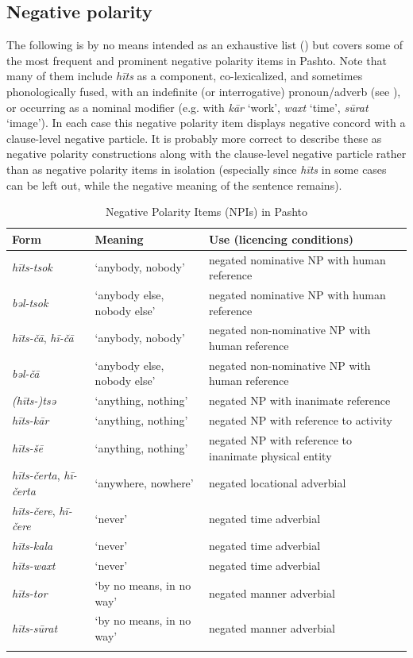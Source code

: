 \documentclass[output=paper,colorlinks,citecolor=brown]{langscibook}
\begin{document}
\subsection{Negative polarity}\label{sec:pas:4.2}

The following is by no means intended as an exhaustive list () but covers some of the most frequent and prominent negative polarity items in Pashto. Note that many of them include \textit{hīts} as a component, co-lexicalized, and sometimes phonologically fused, with an indefinite (or interrogative) pronoun/adverb (see ), or occurring as a nominal modifier (e.g. with \textit{kār} ‘work’, \textit{waxt} ‘time’, \textit{sūrat} ‘image’). In each case this negative polarity item displays negative concord with a clause-level negative particle. It is probably more correct to describe these as negative polarity constructions along with the clause-level negative particle rather than as negative polarity items in isolation (especially since \textit{hīts} in some cases can be left out, while the negative meaning of the sentence remains).

\begin{table}
\begin{tabularx}{\textwidth}{llQ}
\lsptoprule
{Form} & {Meaning} & {Use (licencing conditions)}\\
\midrule 
\textit{hīts{}-tsok} & ‘anybody, nobody’ & negated nominative NP with human reference\\
\textit{bəl-tsok} & ‘anybody else, nobody else’ & negated nominative NP with human reference\\
\textit{hīts-čā}, \textit{hī{}-čā} & ‘anybody, nobody’ & negated non-nominative NP with human reference\\
\textit{bəl-čā} & ‘anybody else, nobody else’ & negated non-nominative NP with human reference\\
\textit{(hīts{}-)tsə} & ‘anything, nothing’ & negated NP with inanimate reference\\
\textit{hīts-kār} & ‘anything, nothing’ & negated NP with reference to activity\\
\textit{hīts-šē} & ‘anything, nothing’ & negated NP with reference to inanimate physical entity\\
\textit{hīts-čerta}, \textit{hī-čerta} & ‘anywhere, nowhere’ & negated locational adverbial\\
\textit{hīts-čere}, \textit{hī-čere} & ‘never’ & negated time adverbial\\
\textit{hīts-kala} & ‘never’ & negated time adverbial\\
\textit{hīts-waxt} & ‘never’ & negated time adverbial\\
\textit{hīts-tor} & ‘by no means, in no way’ & negated manner adverbial\\
\textit{hīts-sūrat} & ‘by no means, in no way’ & negated manner adverbial\\
\lspbottomrule
\end{tabularx}
    \caption{Negative Polarity Items (NPIs) in Pashto}
    \label{tab:pas:2}
\end{table}
\end{document}
